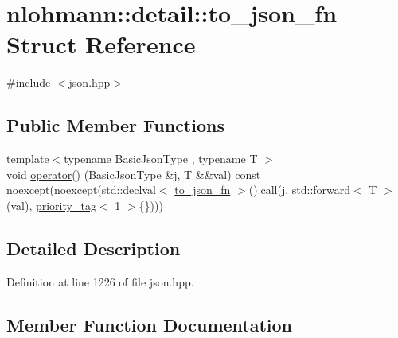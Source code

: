 \hypertarget{structnlohmann_1_1detail_1_1to__json__fn}{}\section{nlohmann\+:\+:detail\+:\+:to\+\_\+json\+\_\+fn Struct Reference}
\label{structnlohmann_1_1detail_1_1to__json__fn}


{\ttfamily \#include $<$json.\+hpp$>$}

\subsection*{Public Member Functions}
\begin{DoxyCompactItemize}
\item 
{\footnotesize template$<$typename Basic\+Json\+Type , typename T $>$ }\\void \hyperlink{structnlohmann_1_1detail_1_1to__json__fn_a29dfa4bfda3ac49ea22a76aaf2af6e0c}{operator()} (Basic\+Json\+Type \&j, T \&\&val) const noexcept(noexcept(std\+::declval$<$ \hyperlink{structnlohmann_1_1detail_1_1to__json__fn}{to\+\_\+json\+\_\+fn} $>$().call(j, std\+::forward$<$ T $>$(val), \hyperlink{structnlohmann_1_1detail_1_1priority__tag}{priority\+\_\+tag}$<$ 1 $>$\{\})))
\end{DoxyCompactItemize}


\subsection{Detailed Description}


Definition at line 1226 of file json.\+hpp.



\subsection{Member Function Documentation}
